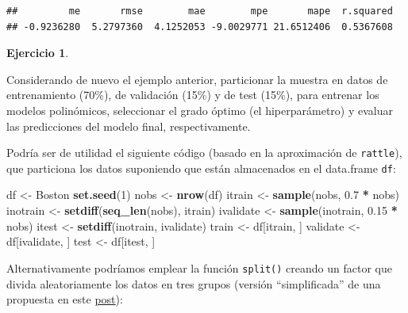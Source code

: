 \documentclass[
]{book}
\newenvironment{Shaded}{\begin{snugshade}}{\end{snugshade}}
\newcommand{\DecValTok}[1]{\textcolor[rgb]{0.00,0.00,0.81}{#1}}
\newcommand{\FloatTok}[1]{\textcolor[rgb]{0.00,0.00,0.81}{#1}}
\newcommand{\KeywordTok}[1]{\textcolor[rgb]{0.13,0.29,0.53}{\textbf{#1}}}
\newcommand{\NormalTok}[1]{#1}
\newcommand{\OperatorTok}[1]{\textcolor[rgb]{0.81,0.36,0.00}{\textbf{#1}}}
\newcommand{\StringTok}[1]{\textcolor[rgb]{0.31,0.60,0.02}{#1}}
\theoremstyle{break}
\theoremstyle{definition}
\theoremstyle{definition}
\theoremstyle{definition}
\newtheorem{exercise}{Ejercicio}[chapter]
\theoremstyle{remark}
\begin{document}
\begin{verbatim}
##         me       rmse        mae        mpe       mape  r.squared 
## -0.9236280  5.2797360  4.1252053 -9.0029771 21.6512406  0.5367608
\end{verbatim}

\begin{exercise}
\protect\hypertarget{exr:train-validate-test}{}{\label{exr:train-validate-test} }
\end{exercise}

Considerando de nuevo el ejemplo anterior, particionar la muestra en datos de entrenamiento (70\%), de validación (15\%) y de test (15\%), para entrenar los modelos polinómicos, seleccionar el grado óptimo (el hiperparámetro) y evaluar las predicciones del modelo final, respectivamente.

Podría ser de utilidad el siguiente código (basado en la aproximación de \texttt{rattle}), que particiona los datos suponiendo que están almacenados en el data.frame \texttt{df}:

\begin{Shaded}
\begin{Highlighting}[]
\NormalTok{df <-}\StringTok{ }\NormalTok{Boston}
\KeywordTok{set.seed}\NormalTok{(}\DecValTok{1}\NormalTok{)}
\NormalTok{nobs <-}\StringTok{ }\KeywordTok{nrow}\NormalTok{(df)}
\NormalTok{itrain <-}\StringTok{ }\KeywordTok{sample}\NormalTok{(nobs, }\FloatTok{0.7} \OperatorTok{*}\StringTok{ }\NormalTok{nobs)}
\NormalTok{inotrain <-}\StringTok{ }\KeywordTok{setdiff}\NormalTok{(}\KeywordTok{seq_len}\NormalTok{(nobs), itrain)}
\NormalTok{ivalidate <-}\StringTok{ }\KeywordTok{sample}\NormalTok{(inotrain, }\FloatTok{0.15} \OperatorTok{*}\StringTok{ }\NormalTok{nobs)}
\NormalTok{itest <-}\StringTok{ }\KeywordTok{setdiff}\NormalTok{(inotrain, ivalidate)}
\NormalTok{train <-}\StringTok{ }\NormalTok{df[itrain, ]}
\NormalTok{validate <-}\StringTok{ }\NormalTok{df[ivalidate, ]}
\NormalTok{test <-}\StringTok{ }\NormalTok{df[itest, ]}
\end{Highlighting}
\end{Shaded}

Alternativamente podríamos emplear la función \texttt{split()} creando un factor que divida aleatoriamente los datos en tres grupos (versión ``simplificada'' de una propuesta en este \href{https://stackoverflow.com/questions/36068963/r-how-to-split-a-data-frame-into-training-validation-and-test-sets}{post}):
\end{document}
